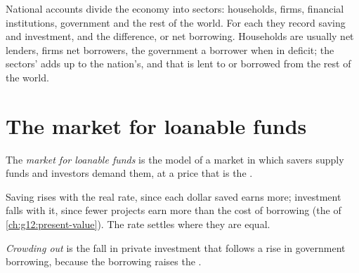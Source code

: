 \begin{measure}
National accounts divide the economy into sectors: households, firms, financial institutions, government and the rest of the world. For each they record saving and
investment, and the difference,  or net borrowing. Households are usually net lenders, firms net borrowers, the government a borrower when in deficit; the
sectors'  adds up to the nation's, and that is lent to or borrowed from the rest of the world.
\end{measure}

\section{The market for loanable funds}\label{sec:g12:saving-and-investment:market}

\begin{definition}\label{def:g12:saving-and-investment:loanable-funds}
The \emph{market for loanable funds} is the model of a market in which savers supply funds and investors demand them, at a price that is the
.
\end{definition}

Saving rises with the real rate, since each dollar saved earns more; investment falls with it, since fewer projects earn more than the cost of borrowing (the  of
\cref{ch:g12:present-value}). The rate settles where they are equal.

\begin{definition}\label{def:g12:saving-and-investment:crowding-out}
\emph{Crowding out} is the fall in private investment that follows a rise in government borrowing, because the borrowing raises the .
\end{definition}


